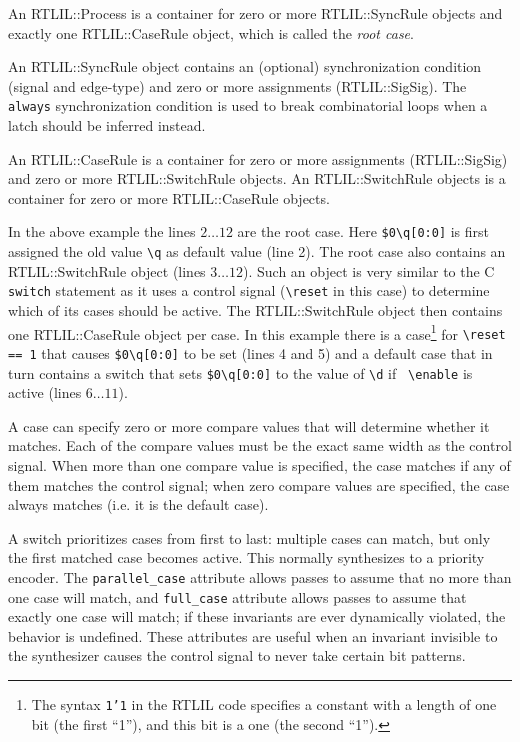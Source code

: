 An RTLIL::Process is a container for zero or more RTLIL::SyncRule objects and
exactly one RTLIL::CaseRule object, which is called the {\it root case}.

An RTLIL::SyncRule object contains an (optional) synchronization condition (signal and edge-type) and zero or
more assignments (RTLIL::SigSig). The {\tt always} synchronization condition is used to break combinatorial
loops when a latch should be inferred instead.

An RTLIL::CaseRule is a container for zero or more assignments (RTLIL::SigSig)
and zero or more RTLIL::SwitchRule objects. An RTLIL::SwitchRule objects is a
container for zero or more RTLIL::CaseRule objects.

In the above example the lines $2 \dots 12$ are the root case. Here {\tt \$0\textbackslash{}q[0:0]} is first
assigned the old value {\tt \textbackslash{}q} as default value (line 2). The root case
also contains an RTLIL::SwitchRule object (lines $3 \dots 12$). Such an object is very similar to the C {\tt switch}
statement as it uses a control signal ({\tt \textbackslash{}reset} in this case) to determine
which of its cases should be active. The RTLIL::SwitchRule object then contains one RTLIL::CaseRule
object per case. In this example there is a case\footnote{The
syntax {\tt 1'1} in the RTLIL code specifies a constant with a length of one bit (the first ``1''),
and this bit is a one (the second ``1'').} for {\tt \textbackslash{}reset == 1} that causes
{\tt \$0\textbackslash{}q[0:0]} to be set (lines 4 and 5) and a default case that in turn contains a switch that
sets {\tt \$0\textbackslash{}q[0:0]} to the value of {\tt \textbackslash{}d} if {\tt
\textbackslash{}enable} is active (lines $6 \dots 11$).

A case can specify zero or more compare values that will determine whether it matches. Each of the compare values
must be the exact same width as the control signal. When more than one compare value is specified, the case matches
if any of them matches the control signal; when zero compare values are specified, the case always matches (i.e.
it is the default case).

A switch prioritizes cases from first to last: multiple cases can match, but only the first matched case becomes
active. This normally synthesizes to a priority encoder. The {\tt parallel\_case} attribute allows passes to assume
that no more than one case will match, and {\tt full\_case} attribute allows passes to assume that exactly one
case will match; if these invariants are ever dynamically violated, the behavior is undefined. These attributes
are useful when an invariant invisible to the synthesizer causes the control signal to never take certain
bit patterns.

